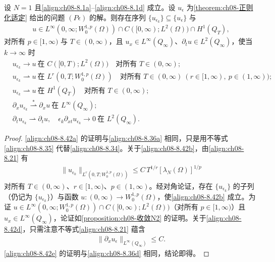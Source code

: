 \documentclass[../../main.tex]{subfiles}%
\begin{document}
\begin{proposition}[$N=1$ 解的收敛]\label{proposition:ch08-收敛N1}
设 $N=1$ 且\eqref{align:ch08-8.1a}--\eqref{align:ch08-8.1d} 成立。设 $u_\epsilon$ 为\cref{theorem:ch08-正则化适定} 给出的问题 $(P\epsilon)$ 的解。则存在序列 $\{u_{\epsilon_k}\}\subseteq\{u_\epsilon\}$ 与
\begin{align*}
u\in L^\infty(0,\infty;W^{1,p}_0(\Omega))\cap C([0,\infty);L^2(\Omega))\cap H^1(Q_T),
\end{align*}
对所有 $p\in[1,\infty)$ 与 $T\in(0,\infty)$，且 $u_x\in L^\infty(Q_\infty)$、$\partial_t u\in L^2(Q_\infty)$，使当 $k\to\infty$ 时
\begin{align}
&u_{\epsilon_k}\to u\ \text{在 }C([0,T);L^2(\Omega))\quad\text{对所有 }T\in(0,\infty); \label{align:ch08-8.42a}\\
&u_{\epsilon_k}\rightharpoonup u\ \text{在 }L^r(0,T;W^{1,p}_0(\Omega))\quad\text{对所有 }T\in(0,\infty)\ (r\in[1,\infty),\ p\in(1,\infty)); \label{align:ch08-8.42b}\\
&u_{\epsilon_k}\rightharpoonup u\ \text{在 }H^1(Q_T)\quad\text{对所有 }T\in(0,\infty); \label{align:ch08-8.42c}\\
&\partial_x u_{\epsilon_k}\stackrel{*}{\rightharpoonup}\partial_x u\ \text{在 }L^\infty(Q_\infty); \label{align:ch08-8.42d}\\
&\partial_t u_{\epsilon_k}\rightharpoonup\partial_t u,\quad
\epsilon_k\partial_{xt}u_{\epsilon_k}\to0\ \text{在 }L^2(Q_\infty). \label{align:ch08-8.42e}
\end{align}
\end{proposition}

\begin{proof}
\eqref{align:ch08-8.42a} 的证明与\eqref{align:ch08-8.36a} 相同，只是用不等式\eqref{align:ch08-8.35} 代替\eqref{align:ch08-8.34}。关于\eqref{align:ch08-8.42b}，由\eqref{align:ch08-8.21} 有
\begin{align}
\|u_{\epsilon_k}\|_{L^r(0,T;W^{1,p}_0(\Omega))}\leqslant C\,T^{1/r}[\lambda_N(\Omega)]^{1/p} \label{align:ch08-8.43}
\end{align}
对所有 $T\in(0,\infty)$、$r\in[1,\infty)$、$p\in(1,\infty)$。经对角论证，存在 $\{u_{\epsilon_k}\}$ 的子列（仍记为 $\{u_{\epsilon_k}\}$）与函数 $u:(0,\infty)\to W^{1,p}_0(\Omega)$，使\eqref{align:ch08-8.42b} 成立。为证 $u\in L^\infty(0,\infty;W^{1,p}_0(\Omega))\cap C([0,\infty);L^2(\Omega))$（对所有 $p\in[1,\infty)$）且 $u_x\in L^\infty(Q_\infty)$，论证如\cref{proposition:ch08-收敛N2} 的证明。关于\eqref{align:ch08-8.42d}，只需注意不等式\eqref{align:ch08-8.21} 蕴含
\begin{align}
\|\partial_x u_\epsilon\|_{L^\infty(Q_\infty)}\leqslant C. \label{align:ch08-8.44}
\end{align}
\eqref{align:ch08-8.42e} 的证明与\eqref{align:ch08-8.36d} 相同，结论即得。
\end{proof}
\end{document}
